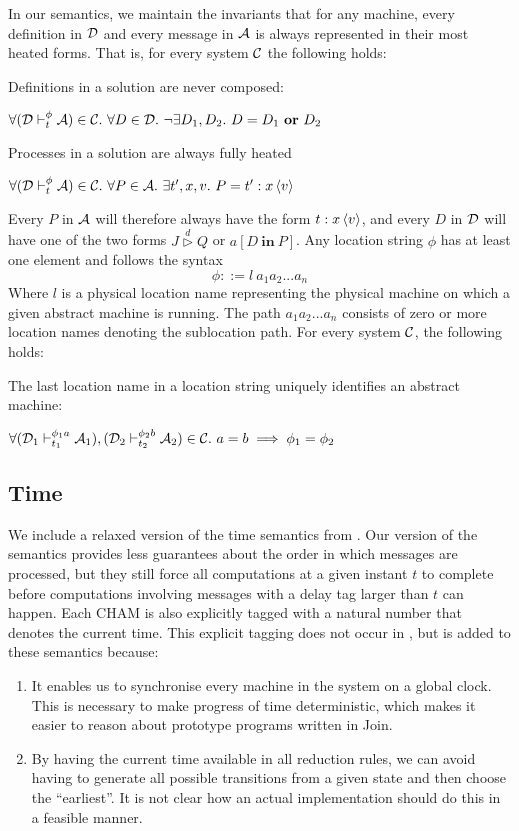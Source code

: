 In our semantics, we maintain the invariants that for any machine, every
definition in $\mathcal{D}$ and every message in $\mathcal{A}$ is always represented in their most
heated forms. That is, for every system $\mathcal{C}$ the following holds:
\begin{theorem}
Definitions in a solution are never composed:

$\forall (\mathcal{D} \vdash_t^\phi \mathcal{A}) \in \mathcal{C}.~ \forall D \in \mathcal{D}.~ \neg\exists D_1, D_2.~ D = D_1~\mathbf{or}~D_2$
\end{theorem}
\begin{theorem}
Processes in a solution are always fully heated

 $\forall (\D \vdash_t^\phi \A) \in \C.~ \forall P \in \A.~ \exists t',x,v.~ P =
 \atm t':x<v>$
\end{theorem}
Every $P$ in $\mathcal{A}$ will therefore
always have the form $\atm t : x<v>$, and every $D$ in $\mathcal{D}$ will have one of the
two forms $J \stackrel{d}{\triangleright} Q$ or $a[D ~\mathbf{in}~ P]$. Any
location string $\phi$ has at least one element and follows the syntax
\begin{equation*}
 \phi ::= l~a_1 a_2 ... a_n
\end{equation*}
Where $l$ is a physical location name representing the physical machine on
which a given abstract machine is running. The path $a_1a_2...a_n$ consists of
zero or more location names denoting the sublocation path. For every system
$\mathcal{C}$, the following holds:
\begin{theorem}
 \label{thm:unique-loc}
 The last location name in a location string uniquely identifies an abstract
 machine:

 $\forall (\mathcal{D}_1 \vdash_{t_1}^{\phi_1 a} \mathcal{A}_1), (\mathcal{D}_2 \vdash_{t_2}^{\phi_2 b}
 \mathcal{A}_2) \in \mathcal{C}.~ a = b \implies \phi_1 = \phi_2$
\end{theorem}


\subsection{Time}
We include a relaxed version of the time semantics from \cite{timed-join}. Our
version of the semantics provides less guarantees about the order in which
messages are processed, but they still force all computations at a given instant
$t$ to complete before computations involving messages with a delay tag larger
than $t$ can happen. Each CHAM is also explicitly tagged with a natural number
that denotes the current time. This explicit tagging does not occur in
\cite{timed-join}, but is added to these semantics because:
\begin{enumerate}
 \item It enables us to synchronise every machine in the system on a global
 clock. This is necessary to make progress of time deterministic, which makes
 it easier to reason about prototype programs written in Join.
 \item By having the current time available in all reduction rules, we can
 avoid having to generate all possible transitions from a given state and then
 choose the ``earliest''. It is not clear how an actual implementation should
 do this in a feasible manner.
\end{enumerate}

